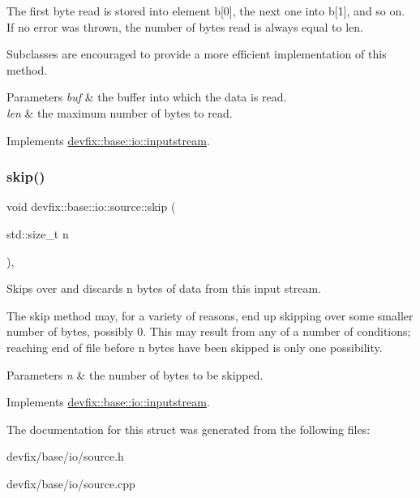 The first byte read is stored into element b\mbox{[}0\mbox{]}, the next one into b\mbox{[}1\mbox{]}, and so on. If no error was thrown, the number of bytes read is always equal to len.

Subclasses are encouraged to provide a more efficient implementation of this method.


\begin{DoxyParams}{Parameters}
{\em buf} & the buffer into which the data is read. \\
\hline
{\em len} & the maximum number of bytes to read. \\
\hline
\end{DoxyParams}


Implements \hyperlink{structdevfix_1_1base_1_1io_1_1inputstream_a17e1a21881ae263650ebdaafaee2e71a}{devfix\+::base\+::io\+::inputstream}.

\mbox{\label{structdevfix_1_1base_1_1io_1_1source_a21cb579307589cbc6f9e02d64c66f4b2}} 
\subsubsection{\texorpdfstring{skip()}{skip()}}
{\footnotesize\ttfamily void devfix\+::base\+::io\+::source\+::skip (\begin{DoxyParamCaption}\item[{std\+::size\+\_\+t}]{n }\end{DoxyParamCaption})\hspace{0.3cm}{\ttfamily [override]}, {\ttfamily [virtual]}}



Skips over and discards n bytes of data from this input stream. 

The skip method may, for a variety of reasons, end up skipping over some smaller number of bytes, possibly 0. This may result from any of a number of conditions; reaching end of file before n bytes have been skipped is only one possibility.


\begin{DoxyParams}{Parameters}
{\em n} & the number of bytes to be skipped. \\
\hline
\end{DoxyParams}


Implements \hyperlink{structdevfix_1_1base_1_1io_1_1inputstream_a1868a733fd646b29daae6874e07e4e03}{devfix\+::base\+::io\+::inputstream}.



The documentation for this struct was generated from the following files\+:\begin{DoxyCompactItemize}
\item 
devfix/base/io/source.\+h\item 
devfix/base/io/source.\+cpp\end{DoxyCompactItemize}
